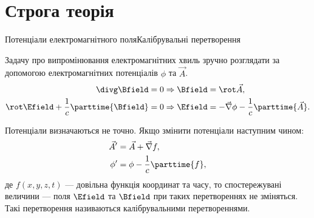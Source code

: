 \documentclass[onlytextwidth]{beamer}
\let\vect\vec
\begin{document}
\section{Строга  теорія}


\begin{frame}{Потенціали електромагнітного поля}{Калібрувальні перетворення}
\begin{block}{}\justifying
	Задачу про випромінювання електромагнітних хвиль зручно розглядати за допомогою електромагнітних потенціалів $ \phi $ та $ \vect{A} $.
	\begin{align*}
		\divg\Bfield = 0                            & \Rightarrow \Bfield = \rot\vect{A},                                     \\
		\rot\Efield + \frac1c\parttime{\Bfield} = 0 & \Rightarrow \Efield = - \vect{\nabla}\phi - \frac1c\parttime{\vect{A}}.
	\end{align*}

	Потенціали визначаються не точно. Якщо змінити потенціали наступним чином:
	\begin{align*}
		\vect{A}' & = \vect{A} + \vect{\nabla} f,  \\
		\phi'     & = \phi - \frac1c \parttime{f},
	\end{align*}
	де $ f (x,y,z,t)$ --- довільна функція координат та часу, то спостережувані величини --- поля $ \Efield $ та $ \Bfield $ при таких перетвореннях не
	зміняться. Такі перетворення називаються \alert{калібрувальними перетвореннями}.
\end{block}
\end{frame}
\end{document}
